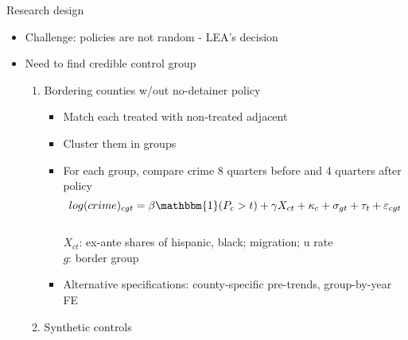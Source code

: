 \documentclass[xcolor=pdftex,dvipsnames,table,handout]{beamer}
\begin{document}
\begin{frame}{Research design}
\begin{itemize}
\item Challenge: policies are not random - LEA's decision\vspace{0.20cm}
\item Need to find credible control group\vspace{0.10cm}
\begin{enumerate}
\item Bordering counties w/out no-detainer policy\vspace{0.10cm}
\begin{itemize}
\item Match each treated with non-treated adjacent\vspace{0.10cm}
\item Cluster them in groups\vspace{0.10cm}
\item For each group, compare crime 8 quarters before and 4 quarters after policy\\\pause
\begin{equation*}
log(crime)_{cgt} = \beta \mathbbm{1}(P_{c}>t) + \gamma X_{ct} + \kappa_{c} + \sigma_{gt} + \tau_{t} + \varepsilon_{cgt}
\end{equation*} \\
$X_{ct}$: ex-ante shares of hispanic, black; migration; u rate \\ $g$: border group\vspace{0.10cm}\pause
\item Alternative specifications: county-specific pre-trends, group-by-year FE
\end{itemize}\vspace{0.10cm}\pause
\item Synthetic controls
\end{enumerate}
\end{itemize}
\end{frame}
\end{document}
